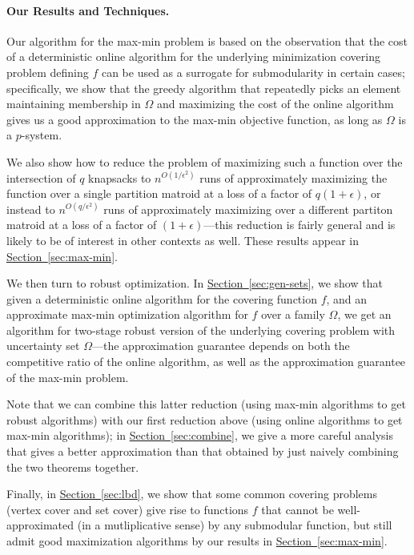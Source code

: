 \documentclass[11pt,letterpaper]{article}
\newcommand{\lref}[2][]{\hyperref[#2]{#1~\ref*{#2}}}
\newcommand{\I}{{\Omega}}
\begin{document}
\paragraph{Our Results and Techniques.} Our algorithm for the max-min
problem is based on the observation that the cost of a deterministic
online algorithm for the underlying minimization covering problem
defining $f$ can be used as a surrogate for submodularity in certain
cases; specifically, we show that the greedy algorithm that repeatedly
picks an element maintaining membership in $\I$ and maximizing the cost
of the online algorithm gives us a good approximation to the max-min
objective function, as long as $\I$ is a $p$-system.

We also show how to reduce the problem of maximizing such a function
over the intersection of $q$ knapsacks to $n^{O(1/\epsilon^2)}$ runs of
approximately maximizing the function over a single partition matroid at
a loss of a factor of $q(1+\epsilon)$, or instead to
$n^{O(q/\epsilon^2)}$ runs of approximately maximizing over a different
partiton matroid at a loss of a factor of $(1+\epsilon)$---this
reduction is fairly general and is likely to be of interest in other
contexts as well. These results appear in \lref[Section]{sec:max-min}.

We then turn to robust optimization. In \lref[Section]{sec:gen-sets}, we
show that given a deterministic online algorithm for the covering
function $f$, and an approximate max-min optimization algorithm for $f$
over a family $\I$, we get an algorithm for two-stage robust version of
the underlying covering problem with uncertainty set $\I$---the
approximation guarantee depends on both the competitive ratio of the
online algorithm, as well as the approximation guarantee of the max-min
problem.

Note that we can combine this latter reduction (using max-min algorithms
to get robust algorithms) with our first reduction above (using online
algorithms to get max-min algorithms); in \lref[Section]{sec:combine}, we
give a more careful analysis that gives a better approximation than that
obtained by just naively combining the two theorems together.

Finally, in \lref[Section]{sec:lbd}, we show that some common covering
problems (vertex cover and set cover) give rise to functions $f$ that
cannot be well-approximated (in a mutliplicative sense) by any
submodular function, but still admit good maximization algorithms by our
results in \lref[Section]{sec:max-min}.
\end{document}
